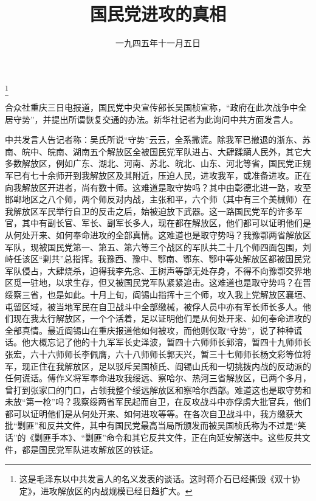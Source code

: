 
\title{国民党进攻的真相}
\date{一九四五年十一月五日}
\thanks{这是毛泽东以中共发言人的名义发表的谈话。这时蒋介石已经撕毁《双十协定》，进攻解放区的内战规模已经日趋扩大。}
\maketitle


合众社重庆三日电报道，国民党中央宣传部长吴国桢宣称，“政府在此次战争中全居守势”，并提出所谓恢复交通的办法。新华社记者为此询问中共方面发言人。

中共发言人告记者称：吴氏所说“守势”云云，全系撒谎。除我军已撤退的浙东、苏南、皖中、皖南、湖南五个解放区全被国民党军队进占、大肆蹂躏人民外，其它大多数解放区，例如广东、湖北、河南、苏北、皖北、山东、河北等省，国民党正规军已有七十余师开到我解放区及其附近，压迫人民，进攻我军，或准备进攻。正在向我解放区开进者，尚有数十师。这难道是取守势吗？其中由彰德北进一路，攻至邯郸地区之八个师，两个师反对内战，主张和平，六个师（其中有三个美械师）在我解放区军民举行自卫的反击之后，始被迫放下武器。这一路国民党军的许多军官，其中有副长官、军长、副军长多人，现在都在解放区，他们都可以证明他们是从何处开来、如何奉命进攻的全部真情。这难道也是取守势吗？我豫鄂两省解放区军队，现被国民党第一、第五、第六等三个战区的军队共二十几个师四面包围，刘峙任该区“剿共”总指挥。我豫西、豫中、鄂南、鄂东、鄂中等处解放区都被国民党军队侵占，大肆烧杀，迫得我李先念、王树声等部无处存身，不得不向豫鄂交界地区觅一驻地，以求生存，但又被国民党军队紧紧追击。这难道也是取守势吗？在晋绥察三省，也是如此。十月上旬，阎锡山指挥十三个师，攻入我上党解放区襄垣、屯留区域，被当地军民在自卫战斗中全部缴械，被俘人员中亦有军长师长多人。他们现在我太行解放区，一个个活着，足以证明他们是从何处开来、如何奉命进攻的全部真情。最近阎锡山在重庆报道他如何被攻，而他则仅取“守势”，说了种种谎话。他大概忘记了他的十九军军长史泽波，暂四十六师师长郭溶，暂四十九师师长张宏，六十六师师长李佩膺，六十八师师长郭天兴，暂三十七师师长杨文彩等位将军，现正住在我解放区，足以驳斥吴国桢氏、阎锡山氏和一切挑拨内战的反动派的任何谎话。傅作义将军奉命进攻我绥远、察哈尔、热河三省解放区，已两个多月，曾打到张家口的门口，占领我整个绥远解放区和察哈尔西部。难道这也是取守势和未放“第一枪”吗？我察绥两省军民起而自卫，在反攻战斗中亦俘虏大批官兵，他们都可以证明他们是从何处开来、如何进攻等等。在各次自卫战斗中，我方缴获大批“剿匪”和反共文件，其中有国民党最高当局所颁发而被吴国桢氏称为不过是“笑话”的《剿匪手本》、“剿匪”命令和其它反共文件，正在向延安解送中。这些反共文件，都是国民党军队进攻解放区的铁证。

